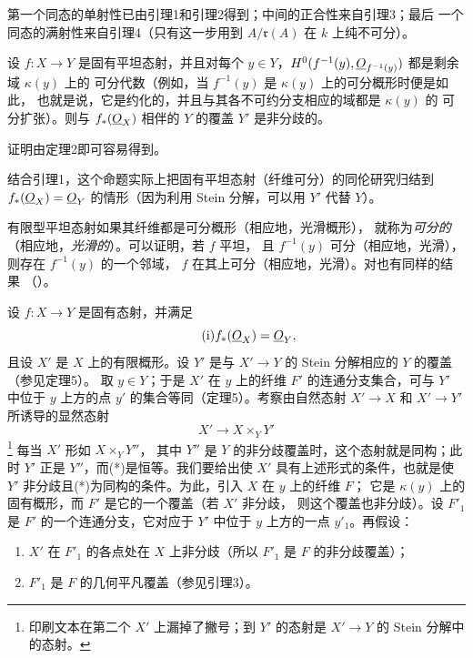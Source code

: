 第一个同态的单射性已由引理1和引理2得到；中间的正合性来自引理3；最后
一个同态的满射性来自引理4（只有这一步用到
$A/\mathfrak r(A)$ 在 $k$ 上纯不可分）。

 设 $f:X\longrightarrow Y$ 是固有平坦态射，并且对每个
$y\in Y$，$H^0(f^{-1}(y),\underline{O}_{f^{-1}(y)})$ 都是剩余域 $\kappa(y)$ 上的
可分代数（例如，当 $f^{-1}(y)$ 是 $\kappa(y)$ 上的可分概形时便是如此，
也就是说，它是约化的，并且与其各不可约分支相应的域都是 $\kappa(y)$ 的
可分扩张）。则与 $f_*(\underline{O}_X)$ 相伴的 $Y$ 的覆盖 $Y'$ 是非分歧的。

证明由定理2即可容易得到。

结合引理1，这个命题实际上把固有平坦态射（纤维可分）的同伦研究归结到
$f_*(\underline{O}_X)=\underline{O}_Y$ 的情形（因为利用 Stein 分解，可以用 $Y'$ 代替
$Y$）。

 有限型平坦态射如果其纤维都是可分概形（相应地，光滑概形），
就称为\emph{可分的}（相应地，\emph{光滑的}）。可以证明，若 $f$ 平坦，
且 $f^{-1}(y)$ 可分（相应地，光滑），则存在 $f^{-1}(y)$ 的一个邻域，
$f$ 在其上可分（相应地，光滑）。对也有同样的结果
（）。

设 $f:X\longrightarrow Y$ 是固有态射，并满足
\begin{equation}
  \tag{i}
  f_*(\underline{O}_X)=\underline{O}_Y,
\end{equation}
且设 $X'$ 是 $X$ 上的有限概形。设 $Y'$ 是与
$X'\longrightarrow Y$ 的 Stein 分解相应的 $Y$ 的覆盖（参见定理5）。
取 $y\in Y$；于是 $X'$ 在 $y$ 上的纤维 $F'$ 的连通分支集合，可与 $Y'$
中位于 $y$ 上方的点 $y'$ 的集合等同（定理5）。考察由自然态射
$X'\longrightarrow X$ 和 $X'\longrightarrow Y'$ 所诱导的显然态射
\begin{equation}
  \tag{*}
  X'\longrightarrow X\times_Y Y'
\end{equation}
\footnote{印刷文本在第二个 $X'$ 上漏掉了撇号；到 $Y'$ 的态射是
$X'\to Y$ 的 Stein 分解中的态射。} 每当 $X'$ 形如 $X\times_Y Y''$，
其中 $Y''$ 是 $Y$ 的非分歧覆盖时，这个态射就是同构；此时 $Y'$ 正是
$Y''$，而(*)是恒等。我们要给出使 $X'$ 具有上述形式的条件，也就是使
$Y'$ 非分歧且(*)为同构的条件。为此，引入 $X$ 在 $y$ 上的纤维 $F$；
它是 $\kappa(y)$ 上的固有概形，而 $F'$ 是它的一个覆盖（若 $X'$ 非分歧，
则这个覆盖也非分歧）。设 $F'_1$ 是 $F'$ 的一个连通分支，它对应于 $Y'$
中位于 $y$ 上方的一点 $y'_1$。再假设：
\begin{enumerate}
  \item[\textit{(ii)}] $X'$ 在 $F'_1$ 的各点处在 $X$ 上非分歧（所以
    $F'_1$ 是 $F$ 的非分歧覆盖）；
  \item[\textit{(iii)}] $F'_1$ 是 $F$ 的几何平凡覆盖（参见引理3）。
\end{enumerate}

